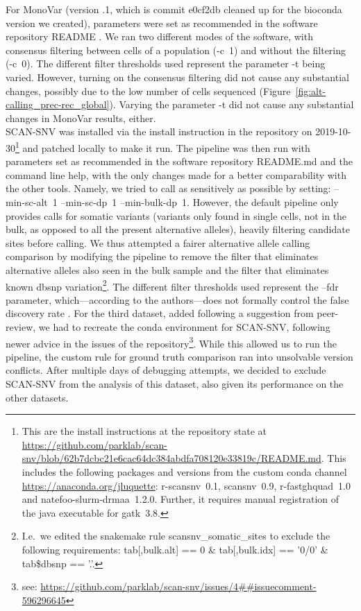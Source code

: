 \documentclass[authoryear,preprint,11pt]{scrartcl}
\begin{document}
For MonoVar (version {.1}, which is commit {\ttfamily e0cf2db} cleaned up for the bioconda version we created), parameters were set as recommended in the software repository README \citep{zafar_monovar_nodate}.
We ran two different modes of the software, with consensus filtering between cells of a population ({\ttfamily -c~1}) and without the filtering ({\ttfamily -c~0}).
The different filter thresholds used represent the parameter {\ttfamily -t} being varied.
However, turning on the consensus filtering did not cause any substantial changes, possibly due to the low number of cells sequenced (Figure~\ref{fig:alt-calling_prec-rec_global}).
Varying the parameter {\ttfamily -t} did not cause any substantial changes in MonoVar results, either.\\

SCAN-SNV \citep{luquette_identification_2019} was installed via the install instruction in the repository on 2019-10-30\footnote{
 This are the install instructions at the repository state at \url{https://github.com/parklab/scan-snv/blob/62b7dcbc21e6cac64dc384abdfa708120e33819c/README.md}.
 This includes the following packages and versions from the custom conda channel \url{https://anaconda.org/jluquette}:
 {\ttfamily r-scansnv~0.1}, {\ttfamily scansnv~0.9}, {\ttfamily r-fastghquad~1.0} and {\ttfamily natefoo-slurm-drmaa~1.2.0}.
 Further, it requires manual registration of the java executable for {\ttfamily gatk~3.8}.
} and patched locally to make it run.
The pipeline was then run with parameters set as recommended in the software repository {\ttfamily README.md} and the command line help, with the only changes made for a better comparability with the other tools.
Namely, we tried to call as sensitively as possible by setting: {\ttfamily  --min-sc-alt~1 --min-sc-dp~1 --min-bulk-dp~1}.
However, the default pipeline only provides calls for somatic variants (variants only found in single cells, not in the bulk, as opposed to all the present alternative alleles), heavily filtering candidate sites before calling.
We thus attempted a fairer alternative allele calling comparison by modifying the pipeline to remove the filter that eliminates alternative alleles also seen in the bulk sample and the filter that eliminates known dbsnp variation\footnote{
 I.e.~we edited the snakemake {\ttfamily rule scansnv\_somatic\_sites} to exclude the following requirements:
 {\ttfamily tab[,bulk.alt] == 0 \& tab[,bulk.idx] == '0/0' \& tab\$dbsnp == '.'}.
}.
The different filter thresholds used represent the {\ttfamily --fdr} parameter, which---according to the authors---does not formally control the false discovery rate \citep{luquette_identification_2019}.
For the third dataset, added following a suggestion from peer-review, we had to recreate the conda environment for SCAN-SNV, following newer advice in the issues of the repository\footnote{see: \url{https://github.com/parklab/scan-snv/issues/4##issuecomment-596296645}}.
While this allowed us to run the pipeline, the custom rule for ground truth comparison ran into unsolvable version conflicts.
After multiple days of debugging attempts, we decided to exclude SCAN-SNV from the analysis of this dataset, also given its performance on the other datasets.\\
\end{document}
